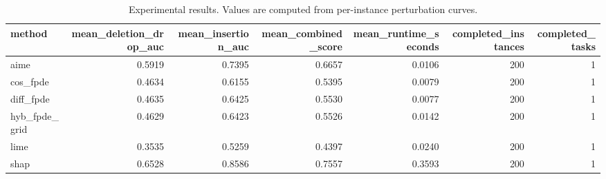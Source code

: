 \begin{table}[t]
\caption{Experimental results. Values are computed from per-instance perturbation curves.}
\label{tab:main_results_computed}
\centering
\begin{tabular}{lrrrrrr}
\toprule
method & mean\_deletion\_drop\_auc & mean\_insertion\_auc & mean\_combined\_score & mean\_runtime\_seconds & completed\_instances & completed\_tasks \\
\midrule
aime & 0.5919 & 0.7395 & 0.6657 & 0.0106 & 200 & 1 \\
cos\_fpde & 0.4634 & 0.6155 & 0.5395 & 0.0079 & 200 & 1 \\
diff\_fpde & 0.4635 & 0.6425 & 0.5530 & 0.0077 & 200 & 1 \\
hyb\_fpde\_grid & 0.4629 & 0.6423 & 0.5526 & 0.0142 & 200 & 1 \\
lime & 0.3535 & 0.5259 & 0.4397 & 0.0240 & 200 & 1 \\
shap & 0.6528 & 0.8586 & 0.7557 & 0.3593 & 200 & 1 \\
\bottomrule
\end{tabular}

\end{table}
